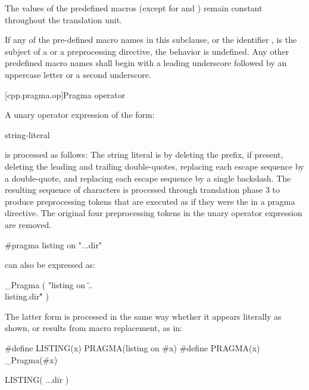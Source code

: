 \pnum
The values of the predefined macros
(except for
and
)
remain constant throughout the translation unit.

\pnum
If any of the pre-defined macro names in this subclause,
or the identifier
,
is the subject of a
or a
preprocessing directive,
the behavior is undefined.
Any other predefined macro names shall begin with a
leading underscore followed by an uppercase letter or a second
underscore.

[cpp.pragma.op]{Pragma operator}%
%

\pnum
A unary operator expression of the form:

\begin{ncbnf}
 \terminal{(} string-literal \terminal{)}
\end{ncbnf}

is processed as follows: The string literal is 
by deleting the  prefix, if present, deleting the leading and trailing
double-quotes, replacing each escape sequence  by a double-quote, and
replacing each escape sequence \tcode{\textbackslash\textbackslash} by a single
backslash. The resulting sequence of characters is processed through translation phase 3
to produce preprocessing tokens that are executed as if they were the
 in a pragma directive. The original four preprocessing
tokens in the unary operator expression are removed.

\pnum
\begin{example}
\begin{codeblock}
#pragma listing on "..\listing.dir"
\end{codeblock}
can also be expressed as:
\begin{codeblock}
_Pragma ( "listing on \"..\\listing.dir\"" )
\end{codeblock}
The latter form is processed in the same way whether it appears literally
as shown, or results from macro replacement, as in:
\begin{codeblock}
#define LISTING(x) PRAGMA(listing on #x)
#define PRAGMA(x) _Pragma(#x)

LISTING( ..\listing.dir )
\end{codeblock}
\end{example}%
